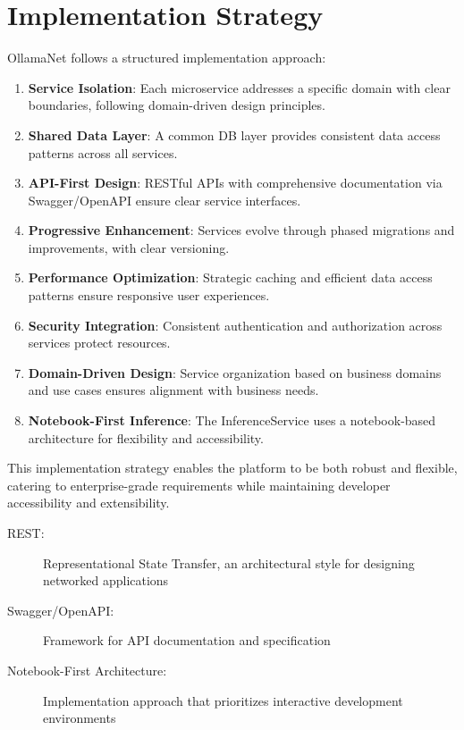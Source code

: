 \section{Implementation Strategy}

OllamaNet follows a structured implementation approach:

\begin{enumerate}
    \item \textbf{Service Isolation}: Each microservice addresses a specific domain with clear boundaries, following domain-driven design principles.
    \item \textbf{Shared Data Layer}: A common DB layer provides consistent data access patterns across all services.
    \item \textbf{API-First Design}: RESTful APIs with comprehensive documentation via Swagger/OpenAPI ensure clear service interfaces.
    \item \textbf{Progressive Enhancement}: Services evolve through phased migrations and improvements, with clear versioning.
    \item \textbf{Performance Optimization}: Strategic caching and efficient data access patterns ensure responsive user experiences.
    \item \textbf{Security Integration}: Consistent authentication and authorization across services protect resources.
    \item \textbf{Domain-Driven Design}: Service organization based on business domains and use cases ensures alignment with business needs.
    \item \textbf{Notebook-First Inference}: The InferenceService uses a notebook-based architecture for flexibility and accessibility.
\end{enumerate}

This implementation strategy enables the platform to be both robust and flexible, catering to enterprise-grade requirements while maintaining developer accessibility and extensibility.

\begin{terminology}
\begin{description}
    \item[REST:] Representational State Transfer, an architectural style for designing networked applications
    \item[Swagger/OpenAPI:] Framework for API documentation and specification
    \item[Notebook-First Architecture:] Implementation approach that prioritizes interactive development environments
\end{description}
\end{terminology}

